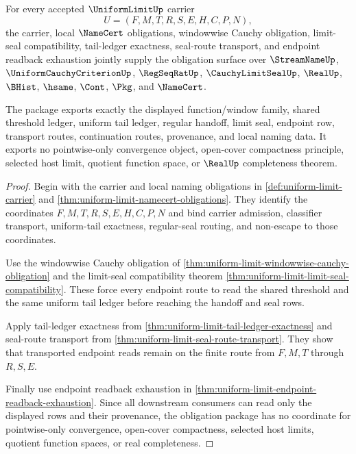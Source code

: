 \begin{theorem}
\label{thm:uniform-limit-obligation-closure-package}
For every accepted $\UniformLimitUp$ carrier
$$
U=(F,M,T,R,S,E,H,C,P,N),
$$
the carrier, local $\NameCert$ obligations, windowwise Cauchy obligation, limit-seal compatibility, tail-ledger exactness, seal-route transport, and endpoint readback exhaustion jointly supply the obligation surface over $\StreamNameUp$, $\UniformCauchyCriterionUp$, $\RegSeqRatUp$, $\CauchyLimitSealUp$, $\RealUp$, $\BHist$, $\hsame$, $\Cont$, $\Pkg$, and $\NameCert$.

The package exports exactly the displayed function/window family, shared threshold ledger, uniform tail ledger, regular handoff, limit seal, endpoint row, transport routes, continuation routes, provenance, and local naming data. It exports no pointwise-only convergence object, open-cover compactness principle, selected host limit, quotient function space, or $\RealUp$ completeness theorem.
\end{theorem}
\begin{proof}
Begin with the carrier and local naming obligations in \autoref{def:uniform-limit-carrier} and \autoref{thm:uniform-limit-namecert-obligations}. They identify the coordinates $F,M,T,R,S,E,H,C,P,N$ and bind carrier admission, classifier transport, uniform-tail exactness, regular-seal routing, and non-escape to those coordinates.

Use the windowwise Cauchy obligation of \autoref{thm:uniform-limit-windowwise-cauchy-obligation} and the limit-seal compatibility theorem \autoref{thm:uniform-limit-limit-seal-compatibility}. These force every endpoint route to read the shared threshold and the same uniform tail ledger before reaching the handoff and seal rows.

Apply tail-ledger exactness from \autoref{thm:uniform-limit-tail-ledger-exactness} and seal-route transport from \autoref{thm:uniform-limit-seal-route-transport}. They show that transported endpoint reads remain on the finite route from $F,M,T$ through $R,S,E$.

Finally use endpoint readback exhaustion in \autoref{thm:uniform-limit-endpoint-readback-exhaustion}. Since all downstream consumers can read only the displayed rows and their provenance, the obligation package has no coordinate for pointwise-only convergence, open-cover compactness, selected host limits, quotient function spaces, or real completeness.
\end{proof}

